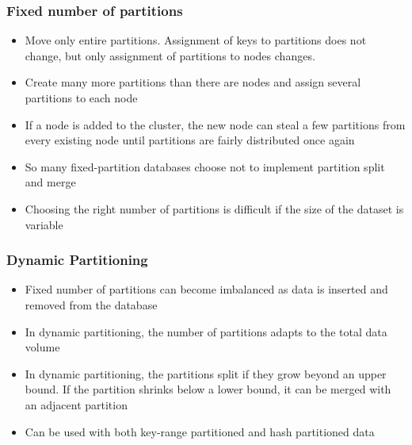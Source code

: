 \documentclass{article}
\begin{document}
\subsubsection{Fixed number of partitions}
\begin{itemize}
    \item Move only entire partitions. Assignment of keys to partitions does not change, but only assignment of partitions to nodes changes.
    
    \item Create many more partitions than there are nodes and assign several partitions to each node
    
    \item  If a node is added to the cluster, the new node can steal a few partitions from every existing node until partitions are fairly distributed once again
    
    \item So many fixed-partition databases choose not to implement partition split and merge 
    
    \item Choosing the right number of partitions is difficult if the size of the dataset is variable
\end{itemize}

\subsubsection{Dynamic Partitioning}
\begin{itemize}
    \item Fixed number of partitions can become imbalanced as data is inserted and removed from the database
    
    \item In dynamic partitioning, the number of partitions adapts to the total data volume
    
    \item In dynamic partitioning, the partitions split if they grow beyond an upper bound. If the partition shrinks below a lower bound, it can be merged with an adjacent partition
    
    \item Can be used with both key-range partitioned and hash partitioned data
\end{itemize}
\end{document}
